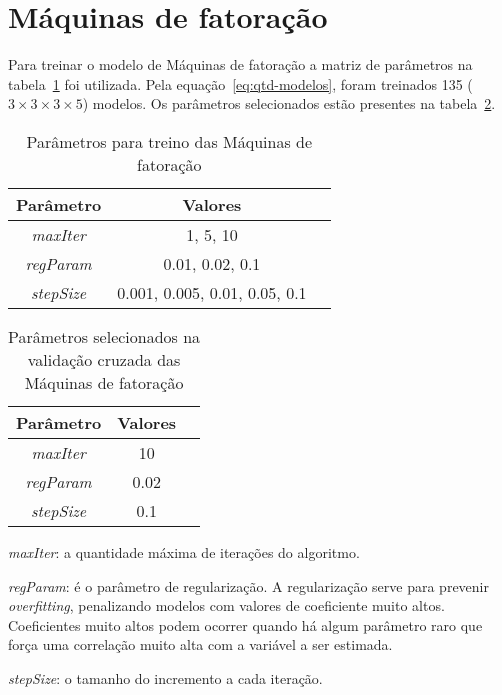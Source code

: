 \section{Máquinas de fatoração}
\label{sec:fm}

Para treinar o modelo de Máquinas de fatoração a matriz de parâmetros na tabela~\ref{tab:param-fm} foi utilizada.
Pela equação~\ref{eq:qtd-modelos}, foram treinados 135 ($3 \times 3 \times 3 \times 5$) modelos.
Os parâmetros selecionados estão presentes na tabela~\ref{tab:param-final-fm}.

\begin{table}[h]
    \centering
    \begin{tabular}{|c|c|c|}
        \hline
        Parâmetro         & Valores                       \\ \hline
        \textit{maxIter}  & 1, 5, 10                      \\
        \textit{regParam} & 0.01, 0.02, 0.1               \\
        \textit{stepSize} & 0.001, 0.005, 0.01, 0.05, 0.1 \\ \hline
    \end{tabular}
    \caption{Parâmetros para treino das Máquinas de fatoração}
    \label{tab:param-fm}
\end{table}

\begin{table}[h]
    \centering
    \begin{tabular}{|c|c|c|}
        \hline
        Parâmetro         & Valores \\ \hline
        \textit{maxIter}  & 10      \\
        \textit{regParam} & 0.02    \\
        \textit{stepSize} & 0.1     \\ \hline
    \end{tabular}
    \caption{Parâmetros selecionados na validação cruzada das Máquinas de fatoração}
    \label{tab:param-final-fm}
\end{table}

\textit{maxIter}: a quantidade máxima de iterações do algoritmo.

\textit{regParam}: é o parâmetro de regularização.
A regularização serve para prevenir \textit{overfitting}, penalizando modelos com valores de coeficiente muito altos.
Coeficientes muito altos podem ocorrer quando há algum parâmetro raro que força uma correlação muito alta com a variável a ser estimada.

\textit{stepSize}: o tamanho do incremento a cada iteração.
